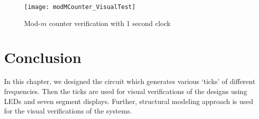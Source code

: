\begin{figure}[!h]
	\centering
	\texttt{[image: modMCounter\_VisualTest]}
	\caption{Mod-$m$ counter verification with 1 second clock}
	\label{fig:modMCounter_VisualTest}
\end{figure}

\section{Conclusion}
In this chapter, we designed the circuit which generates various `ticks' of different frequencies. Then the ticks are used for visual verifications of the designs using LEDs and seven segment displays. Further, structural modeling approach is used for the visual verifications of the systems.